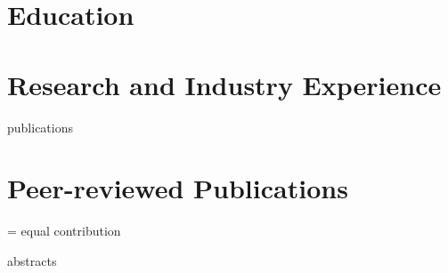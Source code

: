\documentclass[12pt]{report} %
\begin{document}






\contactinformation{}



\section{Education}

\education{}



\section{Research and Industry Experience}
\professional{}



\ifcsname publications\endcsname%
\section{Peer-reviewed Publications}
\publications{}
{\footnotesize* = equal contribution}
\fi



\ifcsname abstracts\endcsname%
\end{document}
